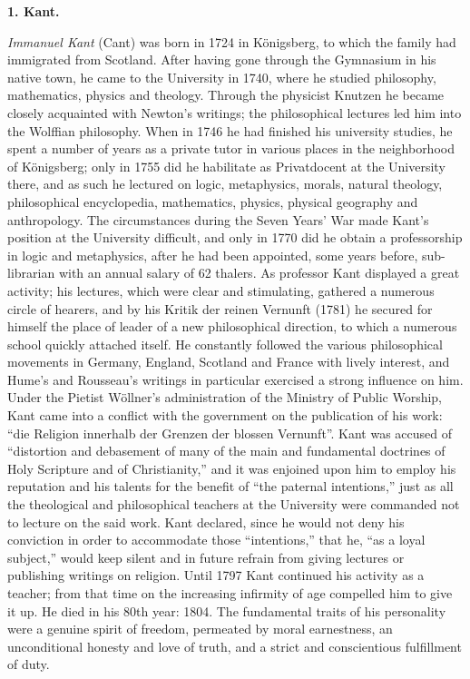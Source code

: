 \begin{center}
  \textbf{1. Kant.}
\end{center}

\emph{Immanuel Kant} (Cant) was born in 1724 in Königsberg,
to which the family had immigrated from Scotland. After having
gone through the Gymnasium in his native town, he came to the
University in 1740, where he studied philosophy, mathematics, physics
and theology. Through the physicist Knutzen he became closely
acquainted with Newton's writings; the philosophical lectures led him
into the Wolffian philosophy. When in 1746 he had finished his
university studies, he spent a number of years as a private tutor in
various places in the neighborhood of Königsberg; only in 1755 did he
habilitate as Privatdocent at the University there, and as such he
lectured on logic, metaphysics, morals, natural theology, philosophical
encyclopedia, mathematics, physics, physical geography and
anthropology. The circumstances during the Seven Years' War made Kant's
position at the University difficult, and only in 1770 did he obtain a
professorship in logic and metaphysics, after he had been appointed,
some years before, sub-librarian with an annual salary of 62 thalers.
As professor Kant displayed a great activity; his lectures, which were
clear and stimulating, gathered a numerous circle of hearers, and by
his Kritik der reinen Vernunft (1781) he secured for himself the place
of leader of a new philosophical direction, to which a numerous school
quickly attached itself. He constantly followed the various
philosophical movements in Germany, England, Scotland and France with
lively interest, and Hume's and Rousseau's writings in particular
exercised a strong influence on him. Under the Pietist Wöllner's
administration of the Ministry of Public Worship, Kant came into a
conflict with the government on the publication of his work:
``die Religion innerhalb der Grenzen der blossen Vernunft''.
Kant was accused of ``distortion and debasement of many of the main and
fundamental doctrines of Holy Scripture and of Christianity,'' and it
was enjoined upon him to employ his reputation and his talents for the
benefit of ``the paternal intentions,'' just as all the theological and
philosophical teachers at the University were commanded not to lecture
on the said work. Kant declared, since he would not deny his conviction
in order to accommodate those ``intentions,'' that he, ``as a loyal
subject,'' would keep silent and in future refrain from giving lectures
or publishing writings on religion. Until 1797 Kant continued his
activity as a teacher; from that time on the increasing infirmity of
age compelled him to give it up. He died in his 80th year: 1804. The
fundamental traits of his personality were a genuine spirit of freedom,
permeated by moral earnestness, an unconditional honesty and love of
truth, and a strict and conscientious fulfillment of duty.

